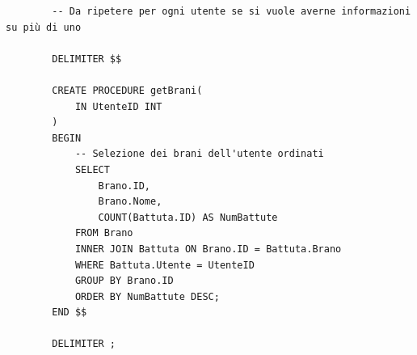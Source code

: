 \documentclass{article}
\begin{document}
    \begin{verbatim}
        -- Da ripetere per ogni utente se si vuole averne informazioni su più di uno

        DELIMITER $$

        CREATE PROCEDURE getBrani(
            IN UtenteID INT
        )
        BEGIN
            -- Selezione dei brani dell'utente ordinati
            SELECT
                Brano.ID,
                Brano.Nome,
                COUNT(Battuta.ID) AS NumBattute
            FROM Brano
            INNER JOIN Battuta ON Brano.ID = Battuta.Brano
            WHERE Battuta.Utente = UtenteID
            GROUP BY Brano.ID
            ORDER BY NumBattute DESC;
        END $$

        DELIMITER ;
    \end{verbatim}
\end{document}

